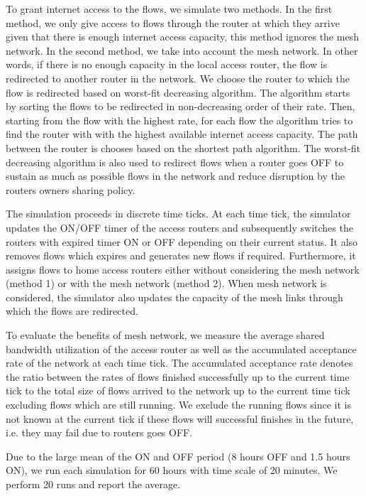To grant internet access to the flows, we simulate two methods. In the first method, we only give access to flows through the router at which they arrive given that there is enough internet access capacity, this method ignores the mesh network. In the second method, we take into account the mesh network. In other words, if there is no enough capacity in the local access router, the flow is redirected to another router in the network. We choose the router to which the flow is redirected based on worst-fit decreasing algorithm. The algorithm starts by sorting the flows to be redirected in non-decreasing order of their rate. Then, starting from the flow with the highest rate, for each flow the algorithm tries to find the router with with the highest available internet access capacity. The path between the router is chooses based on the shortest path algorithm. The worst-fit decreasing algorithm is also used to redirect flows when a router goes OFF to sustain as much as possible flows in the network and reduce disruption by the routers owners sharing policy.

The simulation proceeds in discrete time ticks. At each time tick, the simulator updates the ON/OFF timer of the access routers and subsequently switches the routers with expired timer ON or OFF depending on their current status. It also removes flows which expires and generates new flows if required. Furthermore, it assigns flows to home access routers either without considering the mesh network (method 1) or with the mesh network (method 2). When mesh network is considered, the simulator also updates the capacity of the mesh links through which the flows are redirected. 

To evaluate the benefits of mesh network, we measure the average shared bandwidth utilization of the access router as well as the accumulated acceptance rate of the network at each time tick. The accumulated acceptance rate denotes the ratio between the rates of flows finished successfully up to the current time tick to the total size of flows arrived to the network up to the current time tick excluding flows which are still running. We exclude the running flows since it is not known at the current tick if these flows will successful finishes in the future, i.e. they may fail due to routers goes OFF. 

Due to the large mean of the ON and OFF period (8 hours OFF and 1.5 hours ON), we run each simulation for 60 hours with time scale of 20 minutes. We perform 20 runs and report the average. 
 
